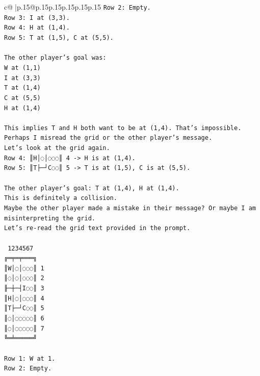 \documentclass{article}
\begin{document}
{\begin{supertabular}{c@{$\;$}|p{.15\linewidth}@{}p{.15\linewidth}p{.15\linewidth}p{.15\linewidth}p{.15\linewidth}p{.15\linewidth}}
{{{\texttt{Row 2: Empty.} \\
\texttt{Row 3: I at (3,3).} \\
\texttt{Row 4: H at (1,4).} \\
\texttt{Row 5: T at (1,5), C at (5,5).} \\
\\ 
\texttt{The other player's goal was:} \\
\texttt{W at (1,1)} \\
\texttt{I at (3,3)} \\
\texttt{T at (1,4)} \\
\texttt{C at (5,5)} \\
\texttt{H at (1,4)} \\
\\ 
\texttt{This implies T and H both want to be at (1,4). That's impossible.} \\
\texttt{Perhaps I misread the grid or the other player's message.} \\
\texttt{Let's look at the grid again.} \\
\texttt{Row 4: ║H│◌│◌◌◌║ 4 {-}> H is at (1,4).} \\
\texttt{Row 5: ║T├─┘C◌◌║ 5 {-}> T is at (1,5), C is at (5,5).} \\
\\ 
\texttt{The other player's goal: T at (1,4), H at (1,4).} \\
\texttt{This is definitely a collision.} \\
\texttt{Maybe the other player made a mistake in their message? Or maybe I am misinterpreting the grid.} \\
\texttt{Let's re{-}read the grid text provided in the prompt.} \\
\\ 
\texttt{ 1234567} \\
\texttt{╔═╤═╤═══╗} \\
\texttt{║W│◌│◌◌◌║ 1} \\
\texttt{║◌│◌│◌◌◌║ 2} \\
\texttt{╟─┼─┤I◌◌║ 3} \\
\texttt{║H│◌│◌◌◌║ 4} \\
\texttt{║T├─┘C◌◌║ 5} \\
\texttt{║◌│◌◌◌◌◌║ 6} \\
\texttt{║◌│◌◌◌◌◌║ 7} \\
\texttt{╚═╧═════╝} \\
\\ 
\texttt{Row 1: W at 1.} \\
\texttt{Row 2: Empty.} \\
}}}
\end{supertabular}}
\end{document}
